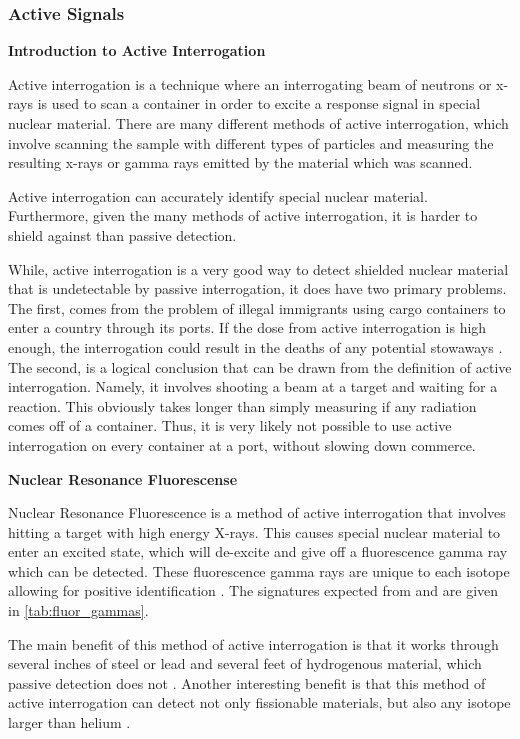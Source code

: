 \documentclass{report}
\newcommand{\myparagraph}[1]{\paragraph*{#1\\}}
\begin{document}
\subsubsection{Active Signals}


\textbf{Introduction to Active Interrogation}


Active interrogation is a technique where an interrogating beam of neutrons or x-rays is used to scan a container in order to excite a response signal in special nuclear material. There are many different methods of active interrogation, which involve scanning the sample with different types of particles and measuring the resulting x-rays or gamma rays emitted by the material which was scanned.

Active interrogation can accurately identify special nuclear material. Furthermore, given the many methods of active interrogation, it is harder to shield against than passive detection.

While, active interrogation is a very good way to detect shielded nuclear material that is undetectable by passive interrogation, it does have two primary problems. The first, comes from the problem of illegal immigrants using cargo containers to enter a country through its ports. If the dose from active interrogation is high enough, the interrogation could result in the deaths of any potential stowaways \cite{Morse2014}. The second, is a logical conclusion that can be drawn from the definition of active interrogation. Namely, it involves shooting a beam at a target and waiting for a reaction. This obviously takes longer than simply measuring if any radiation comes off of a container. Thus, it is very likely not possible to use active interrogation on every container at a port, without slowing down commerce.

\textbf{Nuclear Resonance Fluorescense}

Nuclear Resonance Fluorescence is a method of active interrogation that involves hitting a target with high energy X-rays. This causes special nuclear material to enter an excited state, which will de-excite and give off a fluorescence gamma ray which can be detected. These fluorescence gamma rays are unique to each isotope allowing for positive identification \cite{Morse2014a}. The signatures expected from  and  are given in \autoref{tab:fluor_gammas}.

The main benefit of this method of active interrogation is that it works through several inches of steel or lead and several feet of hydrogenous material, which passive detection does not \cite{PhysRevC.78.041601}. Another interesting benefit is that this method of active interrogation can detect not only fissionable materials, but also any isotope larger than helium \cite{Bertozzi2005}.
\end{document}
